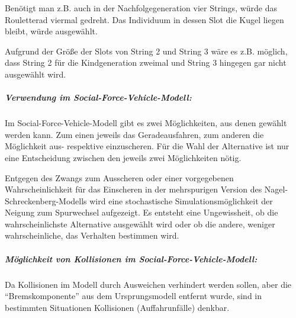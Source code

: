 Benötigt man z.B. auch in der Nachfolgegeneration vier Strings, würde das Rouletterad viermal gedreht.
Das Individuum in dessen Slot die Kugel liegen bleibt, würde ausgewählt.

Aufgrund der Größe der Slots von String 2 und String 3 wäre es z.B. möglich, dass String 2 für die Kindgeneration zweimal und String 3 hingegen gar nicht ausgewählt wird.


\subparagraph{Verwendung im Social-Force-Vehicle-Modell:}

Im Social-Force-Vehicle-Modell gibt es zwei Möglichkeiten, aus denen gewählt werden kann. 
Zum einen jeweils das Geradeausfahren, zum anderen die Möglichkeit aus- respektive einzuscheren.
Für die Wahl der Alternative ist nur eine Entscheidung zwischen den jeweils zwei Möglichkeiten nötig.

Entgegen des Zwangs zum Ausscheren oder einer vorgegebenen Wahrscheinlichkeit für das Einscheren in der mehrspurigen Version des Nagel-Schreckenberg-Modells wird eine stochastische Simulationsmöglichkeit der Neigung zum Spurwechsel aufgezeigt.
Es entsteht eine Ungewissheit, ob die wahrscheinlichste Alternative ausgewählt wird oder ob die andere, weniger wahrscheinliche, das Verhalten bestimmen wird. 


\subparagraph{Möglichkeit von Kollisionen im Social-Force-Vehicle-Modell:}

Da Kollisionen im Modell durch Ausweichen verhindert werden sollen, aber die \enquote{Bremskomponente} aus dem Ursprungsmodell entfernt wurde, sind in bestimmten Situationen Kollisionen (Auffahrunfälle) denkbar.

